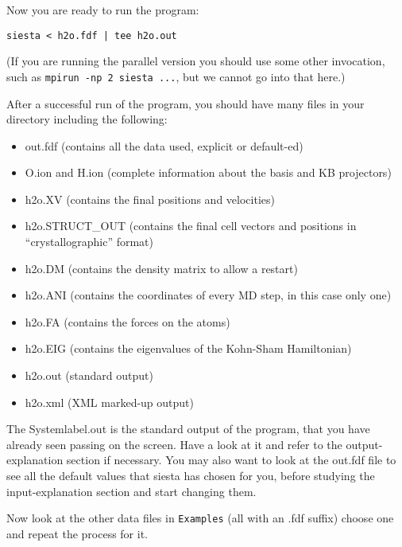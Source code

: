 \documentclass[11pt]{article}
\begin{document}
\noindent
Now you are ready to run the program:

{\tt siesta < h2o.fdf | tee h2o.out}

\noindent
(If you are running the parallel version you should use some other 
invocation, such as {\tt mpirun -np 2 siesta ...}, but we cannot 
go into that here.)

After a successful run of the program, you should have many
files in your directory including the following:
\begin{itemize}

\item out.fdf
 (contains all the data used, explicit or default-ed) 
\item O.ion and H.ion
 (complete information about the basis and KB projectors)
\item h2o.XV
 (contains the final positions and velocities)
\item h2o.STRUCT\_OUT
 (contains the final cell vectors and positions in
 ``crystallographic'' format)
\item h2o.DM
 (contains the density matrix to allow a restart)
\item h2o.ANI
 (contains the coordinates of every MD step, in this case only one)
\item h2o.FA
 (contains the forces on the atoms)
\item h2o.EIG
 (contains the eigenvalues of the Kohn-Sham Hamiltonian)
\item h2o.out
 (standard output)
\item h2o.xml
 (XML marked-up output)
\end{itemize}

The Systemlabel.out is the standard output of the program, that you
have already seen passing on the screen. Have a look at it
and refer to the output-explanation section if necessary.
You may also want to look at the out.fdf file to see all
the default values that siesta has chosen for you, before
studying the input-explanation section and start changing them.

Now look at the other data files in {\tt Examples}
(all with an .fdf suffix) choose one and repeat the process for it.
\end{document}
